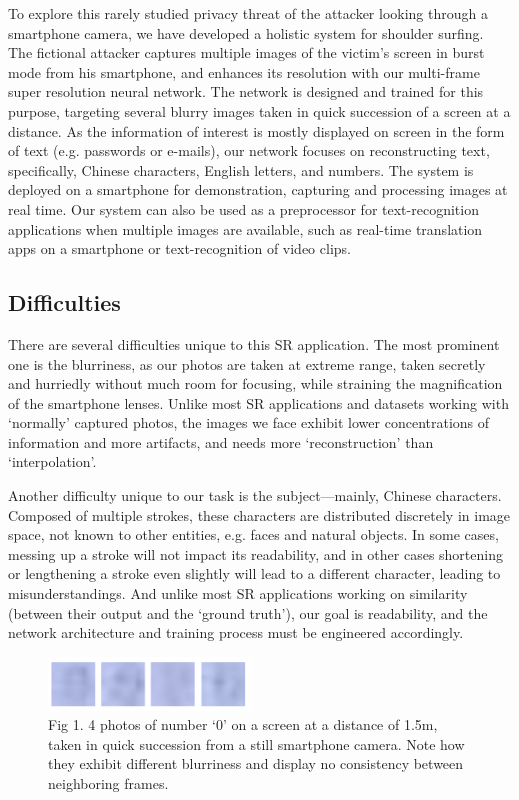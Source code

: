 To explore this rarely studied privacy threat of the attacker looking through a smartphone camera, we have developed a holistic system for shoulder surfing. The fictional attacker captures multiple images of the victim’s screen in burst mode from his smartphone, and enhances its resolution with our multi-frame super resolution neural network. The network is designed and trained for this purpose, targeting several blurry images taken in quick succession of a screen at a distance. As the information of interest is mostly displayed on screen in the form of text (e.g. passwords or e-mails), our network focuses on reconstructing text, specifically, Chinese characters, English letters, and numbers. The system is deployed on a smartphone for demonstration, capturing and processing images at real time. Our system can also be used as a preprocessor for text-recognition applications when multiple images are available, such as real-time translation apps on a smartphone or text-recognition of video clips.

\subsection{Difficulties}
There are several difficulties unique to this SR application. The most prominent one is the blurriness, as our photos are taken at extreme range, taken secretly and hurriedly without much room for focusing, while straining the magnification of the smartphone lenses. Unlike most SR applications and datasets working with ‘normally’ captured photos, the images we face exhibit lower concentrations of information and more artifacts, and needs more ‘reconstruction’ than ‘interpolation’.

Another difficulty unique to our task is the subject—mainly, Chinese characters. Composed of multiple strokes, these characters are distributed discretely in image space, not known to other entities, e.g. faces and natural objects. In some cases, messing up a stroke will not impact its readability, and in other cases shortening or lengthening a stroke even slightly will lead to a different character, leading to misunderstandings. And unlike most SR applications working on similarity (between their output and the ‘ground truth’), our goal is readability, and the network architecture and training process must be engineered accordingly.
 
\begin{figure}
	\centering
	\includegraphics[width=0.48\textwidth]{pic/zeros}
    \caption{ Fig 1. 4 photos of number ‘0’ on a screen at a distance of 1.5m, taken in quick succession from a still smartphone camera. Note how they exhibit different blurriness and display no consistency between neighboring frames.}
	\label{fig-zeros}
\end{figure}


